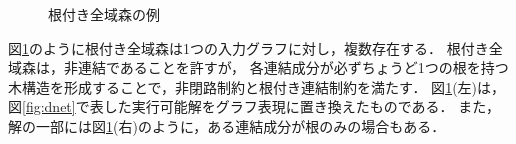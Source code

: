 \begin{figure}[htbp]
 \begin{minipage}{0.5\hsize}
  \centering
  
 \end{minipage}
 \begin{minipage}{0.5\hsize}
  \centering
  
 \end{minipage}
 \caption{根付き全域森の例}
 \label{fig:netuki}
\end{figure}

図\ref{fig:netuki}のように根付き全域森は1つの入力グラフに対し，複数存在する．
根付き全域森は，非連結であることを許すが，
各連結成分が必ずちょうど1つの根を持つ木構造を形成することで，非閉路制約と根付き連結制約を満たす．
図\ref{fig:netuki}(左)は，図\ref{fig:dnet}で表した実行可能解をグラフ表現に置き換えたものである．
また，解の一部には図\ref{fig:netuki}(右)のように，ある連結成分が根のみの場合もある．

